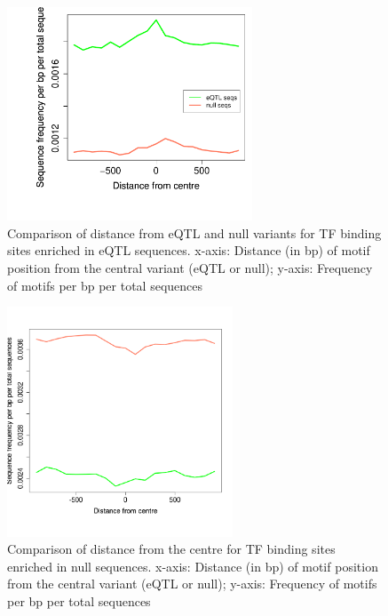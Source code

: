 \documentclass[12pt]{article}
\begin{document}
\begin{figure}[!htbp]
\centering
\includegraphics[width= 0.65\textwidth]{RplotEQTLandNullSequencesCompared.pdf} 
\caption{Comparison of distance from eQTL and null variants for TF binding sites enriched in eQTL sequences. x-axis: Distance (in bp) of motif position from the central variant (eQTL or null); y-axis: Frequency of motifs per bp per total sequences}
\label{distance}
\end{figure}

\newpage


\begin{figure}[!ht]
\centering
\includegraphics[width= 0.6\textwidth]{RplotNullMotifsCompared.png} 
\caption{Comparison of distance from the centre for TF binding sites enriched in null sequences. x-axis: Distance (in bp) of motif position from the central variant (eQTL or null); y-axis: Frequency of motifs per bp per total sequences}
\label{nullDistance}
\end{figure}
\end{document}
